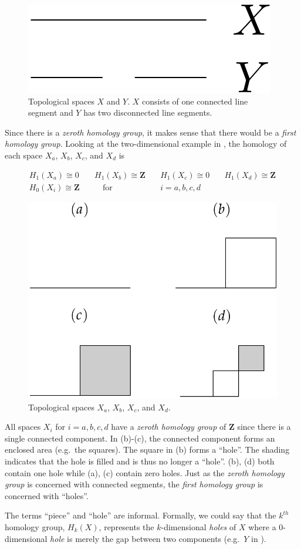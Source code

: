 \begin{figure}
	\begin{center}
		\includegraphics[width=0.2\columnwidth]{Figs/homology1d.pdf}
		\caption{\label{fig:homology1d} Topological spaces $X$ and $Y$. $X$ consists of one connected line segment and $Y$ has two disconnected line segments.}
	\end{center}
\end{figure}

Since there is a \textit{zeroth homology group}, it makes sense that there would be a \textit{first homology group}. Looking at the two-dimensional example in , the homology of each space $X_a$, $X_b$, $X_c$, and $X_d$ is

\begin{align}
	H_1(X_a) \cong 0  & \quad H_1(X_b) \cong \mathbf{Z} & \quad H_1(X_c) \cong 0 & \quad H_1(X_d) \cong \mathbf{Z} \\
	H_0(X_i) \cong \mathbf{Z} & \qquad \text{for} & \quad i = a, b, c, d \label{eq:homology2d}
\end{align}

\begin{figure}
	\begin{center}
		\includegraphics[width=0.6\columnwidth]{Figs/homology2d.pdf}
		\caption{\label{fig:homology2d} Topological spaces $X_a$, $X_b$, $X_c$, and $X_d$.}
	\end{center}
\end{figure}

All spaces $X_i$ for $i = a,b,c,d$ have a \textit{zeroth homology group} of $\mathbf{Z}$ since there is a single connected component. In (b)-(c), the connected component forms an enclosed area (e.g.\ the squares). The square in (b) forms a ``hole''. The shading indicates that the hole is filled and is thus no longer a ``hole''. (b), (d) both contain one hole while (a), (c) contain zero holes. Just as the \textit{zeroth homology group} is concerned with connected segments, the \textit{first homology group} is concerned with ``holes''.

The terms ``piece'' and ``hole'' are informal. Formally, we could say that the $k^{th}$ homology group, $H_k(X)$, represents the $k$-dimensional \textit{holes} of $X$ where a 0-dimensional \textit{hole} is merely the gap between two components (e.g.\ $Y$ in ).


